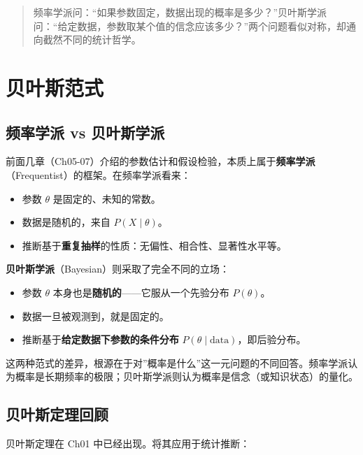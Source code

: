 \documentclass[
]{book}
\providecommand{\tightlist}{%
  \setlength{\itemsep}{0pt}\setlength{\parskip}{0pt}}
\begin{document}
\begin{quote}
频率学派问：``如果参数固定，数据出现的概率是多少？''贝叶斯学派问：``给定数据，参数取某个值的信念应该多少？''两个问题看似对称，却通向截然不同的统计哲学。
\end{quote}

\section{贝叶斯范式}\label{ux8d1dux53f6ux65afux8303ux5f0f}

\subsection{频率学派 vs 贝叶斯学派}\label{ux9891ux7387ux5b66ux6d3e-vs-ux8d1dux53f6ux65afux5b66ux6d3e}

前面几章（Ch05-07）介绍的参数估计和假设检验，本质上属于\textbf{频率学派}（Frequentist）的框架。在频率学派看来：

\begin{itemize}
\tightlist
\item
  参数 \(\theta\) 是固定的、未知的常数。
\item
  数据是随机的，来自 \(P(X \mid \theta)\)。
\item
  推断基于\textbf{重复抽样}的性质：无偏性、相合性、显著性水平等。
\end{itemize}

\textbf{贝叶斯学派}（Bayesian）则采取了完全不同的立场：

\begin{itemize}
\tightlist
\item
  参数 \(\theta\) 本身也是\textbf{随机的}------它服从一个先验分布 \(P(\theta)\)。
\item
  数据一旦被观测到，就是固定的。
\item
  推断基于\textbf{给定数据下参数的条件分布} \(P(\theta \mid \text{data})\)，即后验分布。
\end{itemize}

这两种范式的差异，根源在于对''概率是什么''这一元问题的不同回答。频率学派认为概率是长期频率的极限；贝叶斯学派则认为概率是信念（或知识状态）的量化。

\subsection{贝叶斯定理回顾}\label{ux8d1dux53f6ux65afux5b9aux7406ux56deux987e}

贝叶斯定理在 Ch01 中已经出现。将其应用于统计推断：
\end{document}
